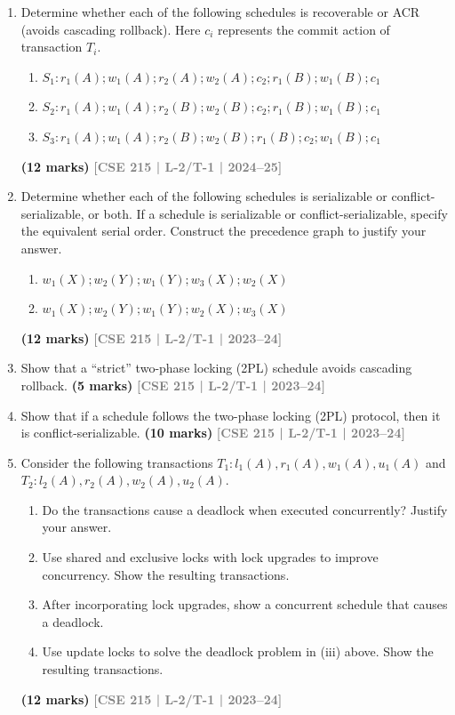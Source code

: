 \documentclass[12pt,a3paper]{article}
\newcommand{\yr}[1]{\hfill\textcolor{gray}{\small\textbf{[#1]}}}
\newcommand{\mk}[1]{\textcolor{orange!70!black}{\small\textbf{(#1 marks)}}}
\begin{document}
\begin{enumerate}
\item Determine whether each of the following schedules is recoverable or ACR (avoids cascading rollback). Here $c_i$ represents the commit action of transaction $T_i$.
\begin{enumerate}
  \item $S_1\colon r_1(A); w_1(A); r_2(A); w_2(A); c_2; r_1(B); w_1(B); c_1$
  \item $S_2\colon r_1(A); w_1(A); r_2(B); w_2(B); c_2; r_1(B); w_1(B); c_1$
  \item $S_3\colon r_1(A); w_1(A); r_2(B); w_2(B); r_1(B); c_2; w_1(B); c_1$
\end{enumerate}
  \mk{12} \yr{CSE 215 | L-2/T-1 | 2024--25}

\item Determine whether each of the following schedules is serializable or conflict-serializable, or both. If a schedule is serializable or conflict-serializable, specify the equivalent serial order. Construct the precedence graph to justify your answer.
\begin{enumerate}
  \item $w_1(X); w_2(Y); w_1(Y); w_3(X); w_2(X)$
  \item $w_1(X); w_2(Y); w_1(Y); w_2(X); w_3(X)$
\end{enumerate}
  \mk{12} \yr{CSE 215 | L-2/T-1 | 2023--24}

\item Show that a ``strict'' two-phase locking (2PL) schedule avoids cascading rollback.
\mk{5} \yr{CSE 215 | L-2/T-1 | 2023--24}

\item Show that if a schedule follows the two-phase locking (2PL) protocol, then it is conflict-serializable.
\mk{10} \yr{CSE 215 | L-2/T-1 | 2023--24}

\item Consider the following transactions $T_1\colon l_1(A), r_1(A), w_1(A), u_1(A)$ and $T_2\colon l_2(A), r_2(A), w_2(A), u_2(A)$.
\begin{enumerate}
  \item Do the transactions cause a deadlock when executed concurrently? Justify your answer.
  \item Use shared and exclusive locks with lock upgrades to improve concurrency. Show the resulting transactions.
  \item After incorporating lock upgrades, show a concurrent schedule that causes a deadlock.
  \item Use update locks to solve the deadlock problem in (iii) above. Show the resulting transactions.
\end{enumerate}
\mk{12} \yr{CSE 215 | L-2/T-1 | 2023--24}


\end{enumerate}
\end{document}

